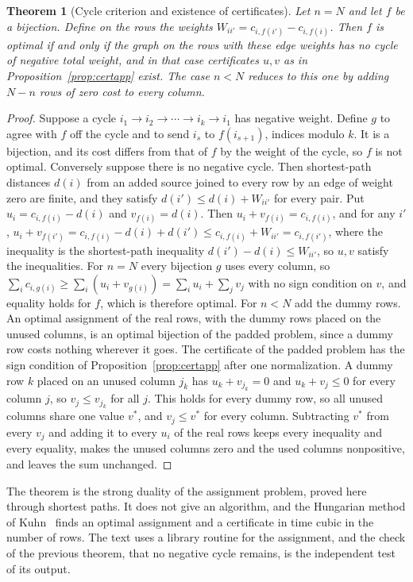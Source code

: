 \documentclass[11pt,twoside,openright]{book}
\theoremstyle{plain}
\newtheorem{theorem}{Theorem}[chapter]
\theoremstyle{definition}
\theoremstyle{remark}
\begin{document}
\begin{theorem}[Cycle criterion and existence of certificates]\label{thm:cycleapp}
Let $n=N$ and let $f$ be a bijection. Define on the rows the weights $W_{ii'}=c_{i,f(i')}-c_{i,f(i)}$. Then $f$ is optimal if and only if the graph on the rows with these edge weights has no cycle of negative total weight, and in that case certificates $u,v$ as in Proposition~\ref{prop:certapp} exist. The case $n<N$ reduces to this one by adding $N-n$ rows of zero cost to every column.
\end{theorem}

\begin{proof}
Suppose a cycle $i_1\to i_2\to\cdots\to i_k\to i_1$ has negative weight. Define $g$ to agree with $f$ off the cycle and to send $i_s$ to $f(i_{s+1})$, indices modulo $k$. It is a bijection, and its cost differs from that of $f$ by the weight of the cycle, so $f$ is not optimal. Conversely suppose there is no negative cycle. Then shortest-path distances $d(i)$ from an added source joined to every row by an edge of weight zero are finite, and they satisfy $d(i')\le d(i)+W_{ii'}$ for every pair. Put $u_i=c_{i,f(i)}-d(i)$ and $v_{f(i)}=d(i)$. Then $u_i+v_{f(i)}=c_{i,f(i)}$, and for any $i'$, $u_i+v_{f(i')}=c_{i,f(i)}-d(i)+d(i')\le c_{i,f(i)}+W_{ii'}=c_{i,f(i')}$, where the inequality is the shortest-path inequality $d(i')-d(i)\le W_{ii'}$, so $u,v$ satisfy the inequalities. For $n=N$ every bijection $g$ uses every column, so $\sum_ic_{i,g(i)}\ge\sum_i(u_i+v_{g(i)})=\sum_iu_i+\sum_jv_j$ with no sign condition on $v$, and equality holds for $f$, which is therefore optimal. For $n<N$ add the dummy rows. An optimal assignment of the real rows, with the dummy rows placed on the unused columns, is an optimal bijection of the padded problem, since a dummy row costs nothing wherever it goes. The certificate of the padded problem has the sign condition of Proposition~\ref{prop:certapp} after one normalization. A dummy row $k$ placed on an unused column $j_k$ has $u_k+v_{j_k}=0$ and $u_k+v_j\le0$ for every column $j$, so $v_j\le v_{j_k}$ for all $j$. This holds for every dummy row, so all unused columns share one value $v^\ast$, and $v_j\le v^\ast$ for every column. Subtracting $v^\ast$ from every $v_j$ and adding it to every $u_i$ of the real rows keeps every inequality and every equality, makes the unused columns zero and the used columns nonpositive, and leaves the sum unchanged.
\end{proof}

The theorem is the strong duality of the assignment problem, proved here through shortest paths. It does not give an algorithm, and the Hungarian method of Kuhn~\cite{kuhn1955} finds an optimal assignment and a certificate in time cubic in the number of rows. The text uses a library routine for the assignment, and the check of the previous theorem, that no negative cycle remains, is the independent test of its output.
\end{document}
